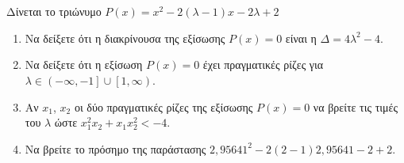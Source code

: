 \documentclass[12pt]{article}
\begin{document}
\part*{}

Δίνεται το τριώνυμο $P(x)=x^2-2(λ-1)x-2λ+2$\begin{enumerate}
  \item Να δείξετε ότι η διακρίνουσα της εξίσωσης $P(x)=0$ είναι η $Δ=4λ^2-4$.
  \item Να δείξετε ότι η εξίσωση $P(x)=0$ έχει πραγματικές ρίζες για $λ\in \left(-\infty,-1\right] \cup \left[1,\infty\right)$.
  \item Αν $x_1$, $x_2$ οι δύο πραγματικές ρίζες της εξίσωσης $P(x)=0$ να βρείτε τις τιμές του $λ$ ώστε $x_1^2x_2+x_1x_2^2<-4$.
  \item Να βρείτε το πρόσημο της παράστασης $2,95641^2-2(2-1)2,95641-2+2$.
\end{enumerate}

\part*{}
\end{document}
